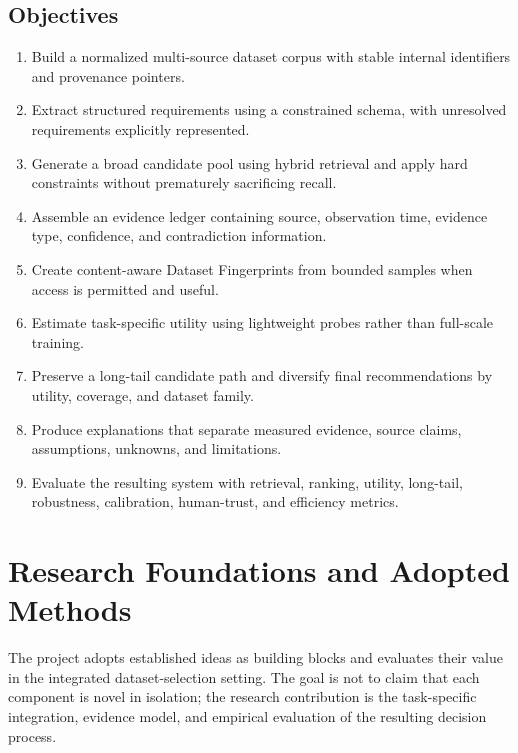 \documentclass[11pt]{article}
\begin{document}
\subsection{Objectives}
\begin{enumerate}[leftmargin=*]
\item Build a normalized multi-source dataset corpus with stable internal identifiers and provenance
      pointers.
\item Extract structured requirements using a constrained schema, with unresolved requirements explicitly
      represented.
\item Generate a broad candidate pool using hybrid retrieval and apply hard constraints without
      prematurely sacrificing recall.
\item Assemble an evidence ledger containing source, observation time, evidence type, confidence, and
      contradiction information.
\item Create content-aware Dataset Fingerprints from bounded samples when access is permitted and useful.
\item Estimate task-specific utility using lightweight probes rather than full-scale training.
\item Preserve a long-tail candidate path and diversify final recommendations by utility, coverage, and
      dataset family.
\item Produce explanations that separate measured evidence, source claims, assumptions, unknowns, and
      limitations.
\item Evaluate the resulting system with retrieval, ranking, utility, long-tail, robustness, calibration,
      human-trust, and efficiency metrics.
\end{enumerate}

\section{Research Foundations and Adopted Methods}
The project adopts established ideas as building blocks and evaluates their value in the integrated
dataset-selection setting. The goal is not to claim that each component is novel in isolation; the research
contribution is the task-specific integration, evidence model, and empirical evaluation of the resulting
decision process.
\end{document}
